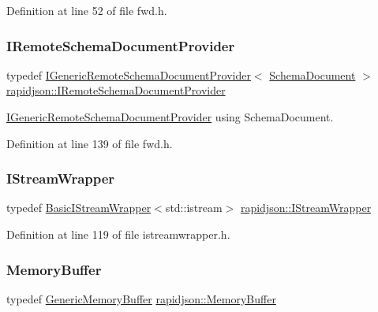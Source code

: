 Definition at line 52 of file fwd.\+h.

\mbox{\label{namespacerapidjson_af91eb8eea47b79d75b23e29fa9c0abb5}} 
\subsubsection{\texorpdfstring{IRemoteSchemaDocumentProvider}{IRemoteSchemaDocumentProvider}}
{\footnotesize\ttfamily typedef \mbox{\hyperlink{classrapidjson_1_1_i_generic_remote_schema_document_provider}{I\+Generic\+Remote\+Schema\+Document\+Provider}}$<$ \mbox{\hyperlink{namespacerapidjson_a52bbb5d64d1319495089e1713a0653cf}{Schema\+Document}} $>$ \mbox{\hyperlink{namespacerapidjson_af91eb8eea47b79d75b23e29fa9c0abb5}{rapidjson\+::\+I\+Remote\+Schema\+Document\+Provider}}}



\mbox{\hyperlink{classrapidjson_1_1_i_generic_remote_schema_document_provider}{I\+Generic\+Remote\+Schema\+Document\+Provider}} using Schema\+Document. 



Definition at line 139 of file fwd.\+h.

\mbox{\label{namespacerapidjson_a4cb54f68bd71aed41b1b26137a7dab84}} 
\subsubsection{\texorpdfstring{IStreamWrapper}{IStreamWrapper}}
{\footnotesize\ttfamily typedef \mbox{\hyperlink{classrapidjson_1_1_basic_i_stream_wrapper}{Basic\+I\+Stream\+Wrapper}}$<$std\+::istream$>$ \mbox{\hyperlink{namespacerapidjson_a4cb54f68bd71aed41b1b26137a7dab84}{rapidjson\+::\+I\+Stream\+Wrapper}}}



Definition at line 119 of file istreamwrapper.\+h.

\mbox{\label{namespacerapidjson_acb643b9055e7988f4cb89ce4f7e6b115}} 
\subsubsection{\texorpdfstring{MemoryBuffer}{MemoryBuffer}}
{\footnotesize\ttfamily typedef \mbox{\hyperlink{structrapidjson_1_1_generic_memory_buffer}{Generic\+Memory\+Buffer}} \mbox{\hyperlink{namespacerapidjson_acb643b9055e7988f4cb89ce4f7e6b115}{rapidjson\+::\+Memory\+Buffer}}}




